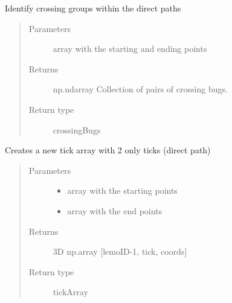 \documentclass[letterpaper,10pt,english]{sphinxmanual}
\begin{document}
\begin{fulllineitems}
\label{\detokenize{reference:taipanPyRouter.findCrossingGroups}}
Identify crossing groups within the direct paths
\begin{quote}\begin{description}
\item[{Parameters}] \leavevmode
{} \textendash{} array with the starting and ending points

\item[{Returns}] \leavevmode
np.ndarray Collection of pairs of crossing bugs.

\item[{Return type}] \leavevmode
crossingBugs

\end{description}\end{quote}

\end{fulllineitems}


\begin{fulllineitems}
\label{\detokenize{reference:taipanPyRouter.initialiseTickArray}}
Creates a new tick array with 2 only ticks (direct path)
\begin{quote}\begin{description}
\item[{Parameters}] \leavevmode\begin{itemize}
\item {} 
 \textendash{} array with the starting points

\item {} 
 \textendash{} array with the end points

\end{itemize}

\item[{Returns}] \leavevmode
3D np.array {[}lemoID-1, tick, coords{]}

\item[{Return type}] \leavevmode
tickArray

\end{description}\end{quote}

\end{fulllineitems}
\end{document}
